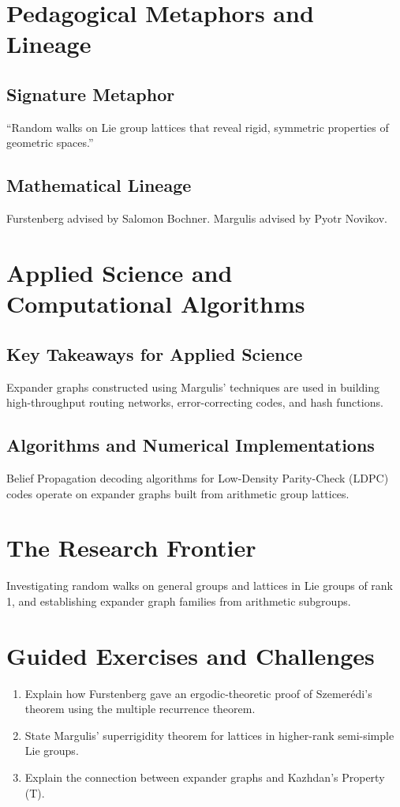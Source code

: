 \section{Pedagogical Metaphors and Lineage}
\subsection{Signature Metaphor}
``Random walks on Lie group lattices that reveal rigid, symmetric properties of geometric spaces.''

\subsection{Mathematical Lineage}
Furstenberg advised by Salomon Bochner. Margulis advised by Pyotr Novikov.

\section{Applied Science and Computational Algorithms}
\subsection{Key Takeaways for Applied Science}
Expander graphs constructed using Margulis' techniques are used in building high-throughput routing networks, error-correcting codes, and hash functions.

\subsection{Algorithms and Numerical Implementations}
Belief Propagation decoding algorithms for Low-Density Parity-Check (LDPC) codes operate on expander graphs built from arithmetic group lattices.

\section{The Research Frontier}
Investigating random walks on general groups and lattices in Lie groups of rank 1, and establishing expander graph families from arithmetic subgroups.

\section{Guided Exercises and Challenges}
\begin{enumerate}[label=\textbf{\arabic*.}]
  \item Explain how Furstenberg gave an ergodic-theoretic proof of Szemer\'edi's theorem using the multiple recurrence theorem.
  \item State Margulis' superrigidity theorem for lattices in higher-rank semi-simple Lie groups.
  \item Explain the connection between expander graphs and Kazhdan's Property (T).
\end{enumerate}

